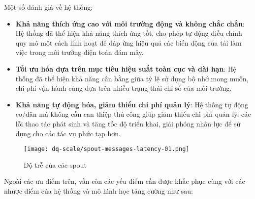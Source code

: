 Một số đánh giá về hệ thống:

\begin{itemize}
    \item \textbf{Khả năng thích ứng cao với môi trường động và không chắc chắn}: Hệ thống đã thể hiện khả năng thích ứng tốt, cho phép tự động điều chỉnh quy mô một cách linh hoạt để đáp ứng hiệu quả các biến động của tải làm việc trong môi trường điện toán đám mây.
    \item \textbf{Tối ưu hóa dựa trên mục tiêu hiệu suất toàn cục và dài hạn}: Hệ thống đã thể hiện khả năng cân bằng giữa tỷ lệ sử dụng bộ nhớ mong muốn, chi phí vận hành cùng dựa trên nhiều trạng thái chỉ số của môi trường.
    \item \textbf{Khả năng tự động hóa, giảm thiểu chi phí quản lý}: Hệ thống tự động co/dãn mà không cần can thiệp thủ công giúp giảm thiểu chi phí quản lý, các lỗi thao tác phát sinh và tăng tốc độ triển khai, giải phóng nhân lực để sử dụng cho các tác vụ phức tạp hơn.
\end{itemize}

\begin{figure}[htbp]
    \centering
    \texttt{[image: dq-scale/spout-messages-latency-01.png]}
    \caption{Độ trễ của các spout}
    \label{fig:evaluate-dq-spout-latency}
\end{figure}

Ngoài các ưu điểm trên, vẫn còn các yếu điểm cần được khắc phục cùng với các nhược điểm của hệ thống và mô hình học tăng cường như sau:

